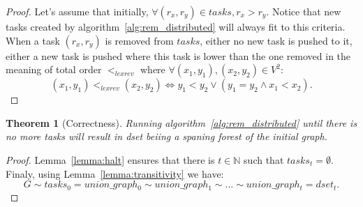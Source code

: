 \documentclass[12px]{article}
\newtheorem{theorem}{Theorem}[section]
\begin{document}
        \begin{proof}
          Let's assume that initially, $\forall (r_x, r_y) \in tasks, r_x > r_y$. Notice that new tasks created by
          algorithm~\ref{alg:rem_distributed} will always fit to this criteria. \\
          When a task $(r_x, r_y)$ is removed from $tasks$, either no new task is pushed to it, either a new task is pushed where this task is lower than the one removed in the meaning of total order $<_{lexrev}$ where $\forall (x_1, y_1), (x_2, y_2) \in V^2$:
          \[ (x_1, y_1) <_{lexrev} (x_2, y_2) \Longleftrightarrow y_1 < y_2 \vee (y_1 = y_2 \wedge x_1 < x_2). \]
        \end{proof}

        \begin{theorem}[Correctness]
          Running algorithm~\ref{alg:rem_distributed} until there is no more tasks will result in dset beiing a spaning forest of the initial graph.
        \end{theorem}

        \begin{proof}
          Lemma~\ref{lemma:halt} ensures that there is $t \in \mathbb{N}$ such that $tasks_t = \emptyset$. Finaly, using Lemma~\ref{lemma:transitivity} we have:
            \[ G \sim tasks_0 = union\_graph_0 \sim union\_graph_1 \sim \hdots \sim union\_graph_t = dset_t. \]
        \end{proof}


  \pagebreak
  
  
\end{document}
